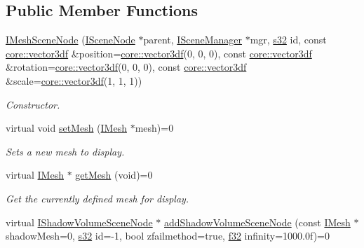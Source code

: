 \subsection*{Public Member Functions}
\begin{DoxyCompactItemize}
\item 
\hyperlink{classirr_1_1scene_1_1IMeshSceneNode_a491d6cac4ec270ab01c24e27c88e6ca4}{I\+Mesh\+Scene\+Node} (\hyperlink{classirr_1_1scene_1_1ISceneNode}{I\+Scene\+Node} $\ast$parent, \hyperlink{classirr_1_1scene_1_1ISceneManager}{I\+Scene\+Manager} $\ast$mgr, \hyperlink{namespaceirr_ac66849b7a6ed16e30ebede579f9b47c6}{s32} id, const \hyperlink{namespaceirr_1_1core_a06f169d08b5c429f5575acb7edbad811}{core\+::vector3df} \&position=\hyperlink{namespaceirr_1_1core_a06f169d08b5c429f5575acb7edbad811}{core\+::vector3df}(0, 0, 0), const \hyperlink{namespaceirr_1_1core_a06f169d08b5c429f5575acb7edbad811}{core\+::vector3df} \&rotation=\hyperlink{namespaceirr_1_1core_a06f169d08b5c429f5575acb7edbad811}{core\+::vector3df}(0, 0, 0), const \hyperlink{namespaceirr_1_1core_a06f169d08b5c429f5575acb7edbad811}{core\+::vector3df} \&scale=\hyperlink{namespaceirr_1_1core_a06f169d08b5c429f5575acb7edbad811}{core\+::vector3df}(1, 1, 1))
\begin{DoxyCompactList}\small\item\em Constructor. \end{DoxyCompactList}\item 
virtual void \hyperlink{classirr_1_1scene_1_1IMeshSceneNode_a8d7e98ddfb990bfc354c9c410a4d788f}{set\+Mesh} (\hyperlink{classirr_1_1scene_1_1IMesh}{I\+Mesh} $\ast$mesh)=0
\begin{DoxyCompactList}\small\item\em Sets a new mesh to display. \end{DoxyCompactList}\item 
virtual \hyperlink{classirr_1_1scene_1_1IMesh}{I\+Mesh} $\ast$ \hyperlink{classirr_1_1scene_1_1IMeshSceneNode_afe540de69bc3a058919cd5ce465be634}{get\+Mesh} (void)=0
\begin{DoxyCompactList}\small\item\em Get the currently defined mesh for display. \end{DoxyCompactList}\item 
virtual \hyperlink{classirr_1_1scene_1_1IShadowVolumeSceneNode}{I\+Shadow\+Volume\+Scene\+Node} $\ast$ \hyperlink{classirr_1_1scene_1_1IMeshSceneNode_ad7cd00b302466dea891c7a0b6b28de19}{add\+Shadow\+Volume\+Scene\+Node} (const \hyperlink{classirr_1_1scene_1_1IMesh}{I\+Mesh} $\ast$shadow\+Mesh=0, \hyperlink{namespaceirr_ac66849b7a6ed16e30ebede579f9b47c6}{s32} id=-\/1, bool zfailmethod=true, \hyperlink{namespaceirr_a0277be98d67dc26ff93b1a6a1d086b07}{f32} infinity=1000.\+0f)=0

\end{DoxyCompactItemize}
